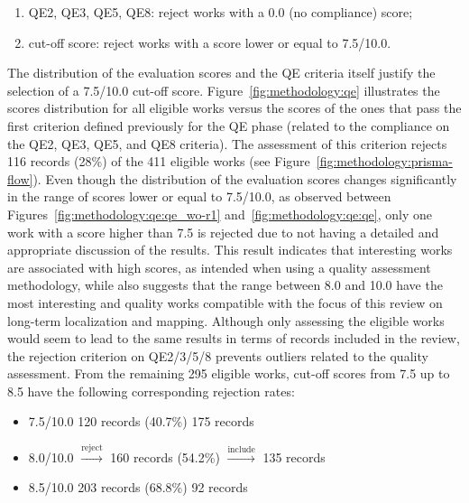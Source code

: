 \begin{enumerate}[nosep]
\item QE2, QE3, QE5, QE8: reject works with a 0.0 (no compliance) score;
\item cut-off score: reject works with a score lower or equal to 7.5/10.0.
\end{enumerate}

The distribution of the evaluation scores and the QE criteria itself justify the selection of a 7.5/10.0 cut-off score. 
Figure~\ref{fig:methodology:qe} illustrates the scores distribution for all eligible works versus the scores of the ones that pass the first criterion defined previously for the QE phase (related to the compliance on the QE2, QE3, QE5, and QE8 criteria). The assessment of this criterion rejects 116 records (28\%) of the 411 eligible works (see Figure~\ref{fig:methodology:prisma-flow}). 
Even though the distribution of the evaluation scores changes significantly in the range of scores lower or equal to 7.5/10.0, as observed between Figures~\ref{fig:methodology:qe:qe_wo-r1} and~\ref{fig:methodology:qe:qe}, only one work with a score higher than 7.5 is rejected due to not having a detailed and appropriate discussion of the results. This result indicates that interesting works are associated with high scores, as intended when using a quality assessment methodology, while also suggests that the range between 8.0 and 10.0 have the most interesting and quality works compatible with the focus of this review on long-term localization and mapping. Although only assessing the eligible works would seem to lead to the same results in terms of records included in the review, the rejection criterion on QE2/3/5/8 prevents outliers related to the quality assessment.
From the remaining 295 eligible works, cut-off scores from 7.5 up to 8.5 have the following corresponding rejection rates:

\begin{itemize}[nosep]
\item 7.5/10.0  120 records (40.7\%)  175 records
\item 8.0/10.0 $\xrightarrow{\text{reject}}$ 160 records (54.2\%) $\xrightarrow{\text{include}}$ 135 records
\item 8.5/10.0  203 records (68.8\%)  92 records
\end{itemize}

